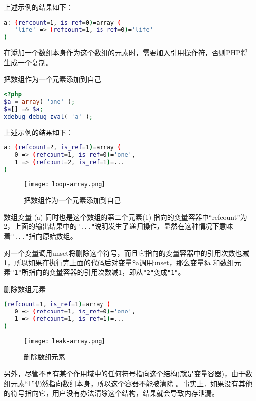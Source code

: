 上述示例的结果如下：

\begin{lstlisting}[language=bash]
a: (refcount=1, is_ref=0)=array (
   'life' => (refcount=1, is_ref=0)='life'
)
\end{lstlisting}

在添加一个数组本身作为这个数组的元素时，需要加入引用操作符，否则PHP将生成一个复制。

\begin{example}
把数组作为一个元素添加到自己
\begin{lstlisting}[language=PHP]
<?php
$a = array( 'one' );
$a[] =& $a;
xdebug_debug_zval( 'a' );
\end{lstlisting}
\end{example}

上述示例的结果如下：

\begin{lstlisting}[language=bash]
a: (refcount=2, is_ref=1)=array (
   0 => (refcount=1, is_ref=0)='one',
   1 => (refcount=2, is_ref=1)=...
)
\end{lstlisting}

\begin{figure}[htbp]
\centering
\texttt{[image: loop-array.png]}
\caption{把数组作为一个元素添加到自己}
\end{figure}

数组变量 (a) 同时也是这个数组的第二个元素(1) 指向的变量容器中“refcount”为 2，上面的输出结果中的\texttt{"..."}说明发生了递归操作，显然在这种情况下意味着\texttt{"..."}指向原始数组。


对一个变量调用unset将删除这个符号，而且它指向的变量容器中的引用次数也减1，所以如果在执行完上面的代码后对变量\$a调用unset，那么变量\$a 和数组元素\texttt{"1"}所指向的变量容器的引用次数减1，即从\texttt{"2"}变成\texttt{"1"}。

\begin{example}
删除数组元素
\begin{lstlisting}[language=bash]
(refcount=1, is_ref=1)=array (
   0 => (refcount=1, is_ref=0)='one',
   1 => (refcount=1, is_ref=1)=...
)
\end{lstlisting}
\end{example}



\begin{figure}[htbp]
\centering
\texttt{[image: leak-array.png]}
\caption{删除数组元素}
\end{figure}

另外，尽管不再有某个作用域中的任何符号指向这个结构(就是变量容器)，由于数组元素“1”仍然指向数组本身，所以这个容器不能被清除 。事实上，如果没有其他的符号指向它，用户没有办法清除这个结构，结果就会导致内存泄漏。

